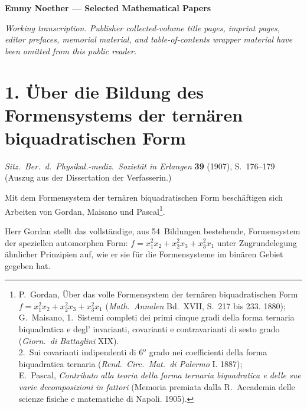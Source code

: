 \documentclass[11pt,a4paper]{article}
\theoremstyle{plain}
\theoremstyle{definition}
\begin{document}
\begin{center}
\Large\textbf{Emmy Noether --- Selected Mathematical Papers}
\end{center}

\vspace{1em}
\noindent\textit{Working transcription. Publisher collected-volume title pages, imprint pages, editor prefaces, memorial material, and table-of-contents wrapper material have been omitted from this public reader.}

\vspace{1em}


\section*{1. \"Uber die Bildung des Formensystems der tern\"aren biquadratischen Form}

\begin{center}
\textit{Sitz.~Ber.~d.~Physikal.-mediz.~Soziet\"at in Erlangen} \textbf{39} (1907), S.~176--179\\
(Auszug aus der Dissertation der Verfasserin.)
\end{center}

\vspace{0.5cm}

Mit dem Formensystem der tern\"aren biquadratischen Form besch\"aftigen sich Arbeiten von Gordan, Maisano und Pascal\footnote{P.~Gordan, \"Uber das volle Formensystem der tern\"aren biquadratischen Form $f = x_1^2 x_2 + x_2^2 x_3 + x_3^2 x_1$ (\textit{Math.~Annalen} Bd.~XVII, S.~217 bis 233. 1880);\\G.~Maisano, 1.~Sistemi completi dei primi cinque gradi della forma ternaria biquadratica e degl' invarianti, covarianti e contravarianti di sesto grado (\textit{Giorn.~di Battaglini} XIX).\\\hspace*{1.5em}2.~Sui covarianti indipendenti di $6^{\mathrm{o}}$ grado nei coefficienti della forma biquadratica ternaria (\textit{Rend.~Circ.~Mat.~di Palermo} I. 1887);\\E.~Pascal, \textit{Contributo alla teoria della forma ternaria biquadratica e delle sue varie decomposizioni in fattori} (Memoria premiata dalla R.~Accademia delle scienze fisiche e matematiche di Napoli. 1905).}.

Herr Gordan stellt das vollst\"andige, aus 54~Bildungen bestehende, Formensystem der speziellen automorphen Form: $f = x_1^2 x_2 + x_2^2 x_3 + x_3^2 x_1$ unter Zugrundelegung \"ahnlicher Prinzipien auf, wie er sie f\"ur die Formensysteme im bin\"aren Gebiet gegeben hat.
\end{document}
